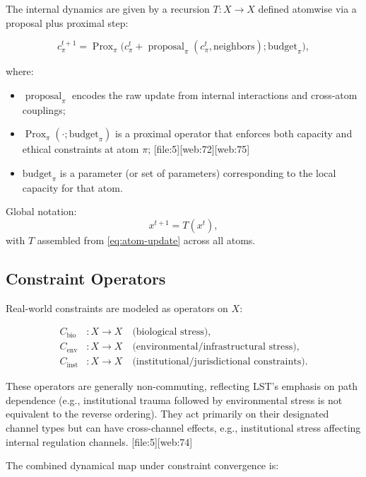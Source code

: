 \documentclass[11pt]{article}
\begin{document}
The internal dynamics are given by a recursion \(T:X\to X\) defined atomwise via a proposal plus proximal step:

\begin{equation}
  c^{t+1}_\pi = \operatorname{Prox}_\pi\bigl(c^t_\pi + \operatorname{proposal}_\pi(c^t_\pi,\text{neighbors}); \text{budget}_\pi\bigr),
  \label{eq:atom-update}
\end{equation}

where:

\begin{itemize}[leftmargin=*]
  \item \(\operatorname{proposal}_\pi\) encodes the raw update from internal interactions and cross-atom couplings;
  \item \(\operatorname{Prox}_\pi(\cdot;\text{budget}_\pi)\) is a proximal operator that enforces both capacity and ethical constraints at atom \(\pi\); [file:5][web:72][web:75]
  \item \(\text{budget}_\pi\) is a parameter (or set of parameters) corresponding to the local capacity for that atom.
\end{itemize}

Global notation:
\[
  x^{t+1} = T(x^t),
\]
with \(T\) assembled from \eqref{eq:atom-update} across all atoms.

\subsection{Constraint Operators}

Real-world constraints are modeled as operators on \(X\):

\begin{align*}
  C_{\text{bio}} &: X \to X \quad \text{(biological stress)},\\
  C_{\text{env}} &: X \to X \quad \text{(environmental/infrastructural stress)},\\
  C_{\text{inst}} &: X \to X \quad \text{(institutional/jurisdictional constraints)}.
\end{align*}

These operators are generally non-commuting, reflecting LST's emphasis on path dependence (e.g., institutional trauma followed by environmental stress is not equivalent to the reverse ordering). They act primarily on their designated channel types but can have cross-channel effects, e.g., institutional stress affecting internal regulation channels. [file:5][web:74]

The combined dynamical map under constraint convergence is:
\end{document}
